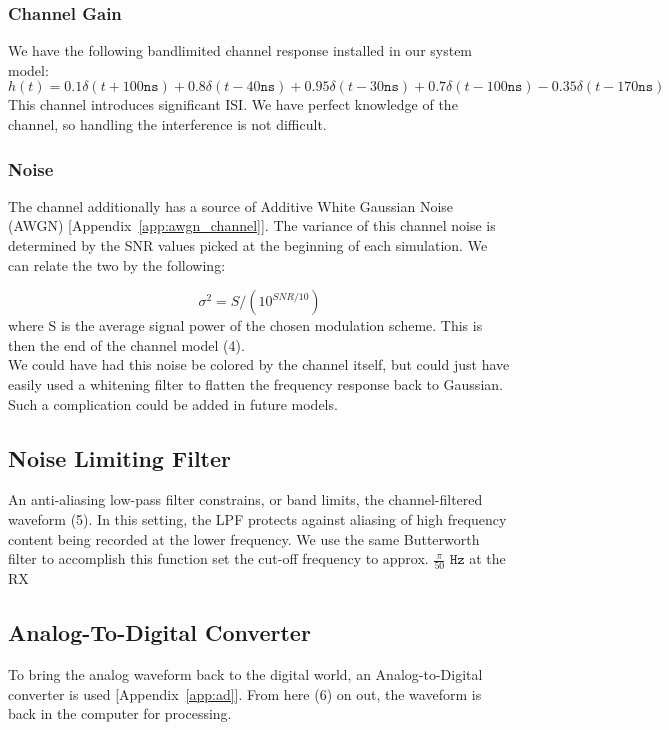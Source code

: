 \documentclass[]{article}
\begin{document}
\subsubsection{Channel Gain}
\label{sec:channelFilter}
We  have the following bandlimited channel response installed in our system model:
 $$h(t) = 0.1\delta(t + 100 \mathtt{ns}) + 0.8\delta(t -40 \mathtt{ns}) + 0.95\delta(t - 30 \mathtt{ns}) + 0.7\delta(t - 100 \mathtt{ns}) - 0.35\delta(t - 170 \mathtt{ns})  $$
This channel introduces significant ISI.  We have perfect knowledge of the channel, so handling the interference is not difficult.

\subsubsection{Noise}
\label{sec:awgn}
The channel additionally has a source of Additive White Gaussian Noise (AWGN) [Appendix~\ref{app:awgn_channel}]. The variance of this channel noise is determined by the SNR values picked at the beginning of each simulation. We can relate the two by the following:

$$\sigma^2 = S/(10^{SNR/10})$$
where S is the average signal power of the chosen modulation scheme.  This is then the end of the channel model (4).\\

We could have had this noise be colored by the channel itself, but could just have easily used a whitening filter to flatten the frequency response back to Gaussian.  Such a complication could be added in future models.  

\subsection{Noise Limiting Filter}
\label{sec:noiseLPF}
An anti-aliasing low-pass filter constrains, or band limits, the channel-filtered waveform (5).  In this setting, the LPF protects against aliasing of high frequency content being recorded at the lower frequency.  We use the same Butterworth filter to accomplish this function set the cut-off frequency to approx. $\frac{\pi}{50}$ $\mathtt{Hz}$ at the RX \\

\subsection{Analog-To-Digital Converter}
\label{sec:adc}
To bring the analog waveform back to the digital world, an Analog-to-Digital converter is used [Appendix~\ref{app:ad}].  From here (6) on out, the waveform is back in the computer for processing.
\end{document}

